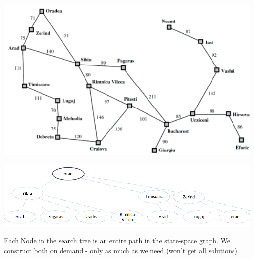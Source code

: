 \documentclass[
../../EiKI_Summary.tex,
]
{subfiles}
\begin{document}
\begin{codebox}
    \begin{algorithm}[H]
    \end{algorithm}
\end{codebox}
\begin{minipage}
    [t]{0.45\textwidth}
    \centering
    \includegraphics[width=\textwidth]{Pics/03/ExampleTreeSearchGraph.png}
\end{minipage}
\hfill
\begin{minipage}
    [t]{0.55\textwidth}
    \centering
    \includegraphics[width=\textwidth]{Pics/03/ExampleTreeSearchTree.png}
\end{minipage}

Each Node in the search tree is an entire path in the state-space graph. We construct both on demand - only as much as we need (won't get all solutions)
\end{document}
